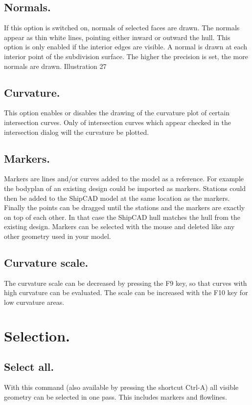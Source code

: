 \documentclass[12pt]{article}
\begin{document}
\subsection{Normals.}
If this option is switched on, normals of selected faces are
drawn. The normals appear as thin white lines, pointing either
inward or outward the hull. This option is only enabled if the
interior edges are visible. A normal is drawn at each interior
point of the subdivision surface. The higher the precision is
set, the more normals are drawn.
Illustration 27

\subsection{Curvature.}
This option enables or disables the drawing of the curvature plot of certain intersection curves. Only
of intersection curves which appear checked in the intersection dialog will the curvature be plotted.

\subsection{Markers.}
Markers are lines and/or curves added to the model as a reference. For example the bodyplan of an
existing design could be imported as markers. Stations could then be added to the ShipCAD
model at the same location as the markers. Finally the points can be dragged until the stations and
the markers are exactly on top of each other. In that case the ShipCAD hull matches the hull from
the existing design.
Markers can be selected with the mouse and deleted like any other geometry used in your model.

\subsection{Curvature scale.}
The curvature scale can be decreased by pressing the F9 key, so that curves with high curvature
can be evaluated. The scale can be increased with the F10 key for low curvature areas.

\section{Selection.}

\subsection{Select all.}
With this command (also available by pressing the shortcut Ctrl-A) all visible geometry can be
selected in one pass. This includes markers and flowlines.
\end{document}
